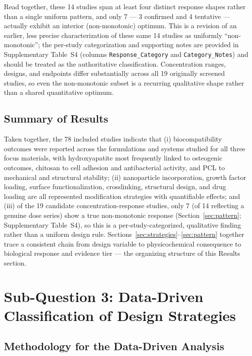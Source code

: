 \documentclass[5p,times,twocolumn]{elsarticle}
\begin{document}
Read together, these 14 studies span at least four distinct response shapes rather than a single uniform pattern, and only 7 --- 3 confirmed and 4 tentative --- actually exhibit an interior (non-monotonic) optimum. This is a revision of an earlier, less precise characterization of these same 14 studies as uniformly ``non-monotonic''; the per-study categorization and supporting notes are provided in Supplementary Table~S4 (columns \texttt{Response\_Category} and \texttt{Category\_Notes}) and should be treated as the authoritative classification. Concentration ranges, designs, and endpoints differ substantially across all 19 originally screened studies, so even the non-monotonic subset is a recurring qualitative shape rather than a shared quantitative optimum.

\subsection{Summary of Results}

Taken together, the 78 included studies indicate that (i) biocompatibility outcomes were reported across the formulations and systems studied for all three focus materials, with hydroxyapatite most frequently linked to osteogenic outcomes, chitosan to cell adhesion and antibacterial activity, and PCL to mechanical and structural stability; (ii) nanoparticle incorporation, growth factor loading, surface functionalization, crosslinking, structural design, and drug loading are all represented modification strategies with quantifiable effects; and (iii) of the 19 candidate concentration-response studies, only 7 (of 14 reflecting a genuine dose series) show a true non-monotonic response (Section~\ref{sec:pattern}; Supplementary Table~S4), so this is a per-study-categorized, qualitative finding rather than a uniform design rule. Sections~\ref{sec:strategies}--\ref{sec:pattern} together trace a consistent chain from design variable to physicochemical consequence to biological response and evidence tier --- the organizing structure of this Results section.

\section{Sub-Question 3: Data-Driven Classification of Design Strategies}
\label{sec:q3}

\subsection{Methodology for the Data-Driven Analysis}
\end{document}

